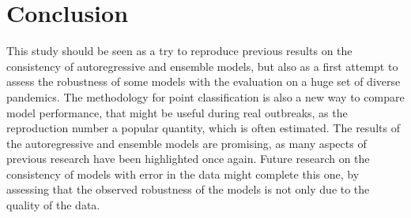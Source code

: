 \section*{Conclusion}


This study should be seen as a try to reproduce previous results on the consistency of autoregressive and ensemble models, but also as a first attempt to assess the robustness of some models with the evaluation on a huge set of diverse pandemics. 
The methodology for point classification is also a new way to compare model performance, that might be useful during real outbreaks, as the reproduction number a popular quantity, which is often estimated. 
The results of the autoregressive and ensemble models are promising, as many aspects of previous research have been highlighted once again.
Future research on the consistency of models with error in the data might complete this one, by assessing that the observed robustness of the models is not only due to the quality of the data.